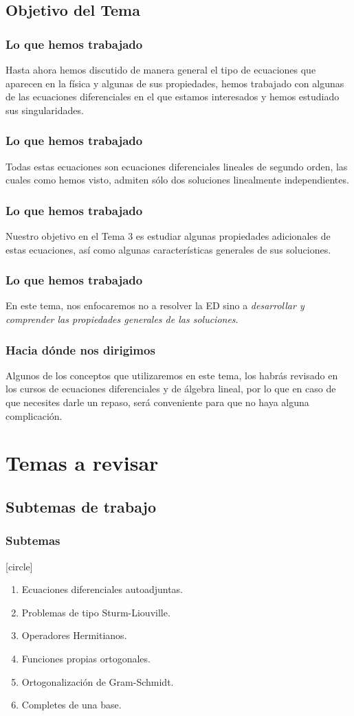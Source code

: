\subsection{Objetivo del Tema}
\begin{frame}
\frametitle{Lo que hemos trabajado}
Hasta ahora hemos discutido de manera general el tipo de ecuaciones que aparecen en la física y algunas de sus propiedades, hemos trabajado con algunas de las ecuaciones diferenciales en el que estamos interesados y hemos estudiado sus singularidades.
\end{frame}
\begin{frame}
\frametitle{Lo que hemos trabajado}
Todas estas ecuaciones son ecuaciones diferenciales lineales de segundo orden, las cuales como hemos visto, admiten sólo dos soluciones linealmente independientes.
\end{frame}
\begin{frame}
\frametitle{Lo que hemos trabajado}
Nuestro objetivo en el Tema 3 es estudiar algunas propiedades adicionales de estas ecuaciones, así como algunas características generales de sus soluciones. 
\end{frame}
\begin{frame}
\frametitle{Lo que hemos trabajado}
En este tema, nos enfocaremos no a resolver la ED sino a \emph{desarrollar y comprender las propiedades generales de las soluciones}.
\end{frame}
\begin{frame}
\frametitle{Hacia dónde nos dirigimos}
Algunos de los conceptos que utilizaremos en este tema, los habrás revisado en los cursos de ecuaciones diferenciales y de álgebra lineal, por lo que en caso de que necesites darle un repaso, será conveniente para que no haya alguna complicación.
\end{frame}
\section{Temas a revisar}
\subsection{Subtemas de trabajo}
\begin{frame}
\frametitle{Subtemas}
[circle]
\begin{enumerate}[<+->]
\item Ecuaciones diferenciales autoadjuntas.
\item Problemas de tipo Sturm-Liouville.
\item Operadores Hermitianos.
\item Funciones propias ortogonales.
\item Ortogonalización de Gram-Schmidt.
\item Completes de una base.
\end{enumerate}
\end{frame}

